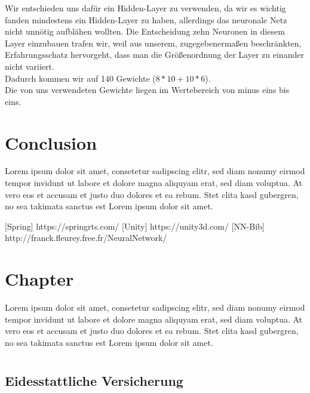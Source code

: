 \documentclass[
	12pt,
	a4paper,
	BCOR10mm,
	DIV14,
	headsepline,
	usegeometry,
]{scrreprt}
\begin{document}
Wir entschieden uns dafür ein Hidden-Layer zu verwenden, da wir es wichtig fanden mindestens ein Hidden-Layer zu haben, allerdings das neuronale Netz nicht unnötig aufblähen wollten. Die Entscheidung zehn Neuronen in diesem Layer einzubauen trafen wir, weil aus unserem, zugegebenermaßen beschränkten, Erfahrungsschatz hervorgeht, dass man die Größenordnung der Layer zu einander nicht variiert.\\
Dadurch kommen wir auf 140 Gewichte ($8 * 10 + 10 * 6$).\\
Die von uns verwendeten Gewichte liegen im Wertebereich von minus eins bis eins.



\chapter{Conclusion}
\label{Conclusion}

Lorem ipsum dolor sit amet, consetetur sadipscing elitr, sed diam nonumy eirmod tempor invidunt ut labore et dolore magna aliquyam erat, sed diam voluptua.
At vero eos et accusam et justo duo dolores et ea rebum.
Stet clita kasd gubergren, no sea takimata sanctus est Lorem ipsum dolor sit amet.




\appendix
\appendixpage

[Spring] https://springrts.com/
[Unity] https://unity3d.com/
[NN-Bib] http://franck.fleurey.free.fr/NeuralNetwork/

\chapter{Chapter}

Lorem ipsum dolor sit amet, consetetur sadipscing elitr, sed diam nonumy eirmod tempor invidunt ut labore et dolore magna aliquyam erat, sed diam voluptua.
At vero eos et accusam et justo duo dolores et ea rebum.
Stet clita kasd gubergren, no sea takimata sanctus est Lorem ipsum dolor sit amet.

\listoffigures

\lstlistoflistings

\listoftables

\chapter*{}

\thispagestyle{empty}

\section*{Eidesstattliche Versicherung}
\end{document}
